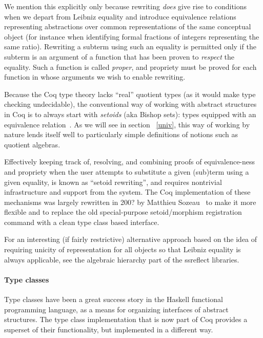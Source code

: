 \documentclass[a4paper,10pt,runningheads]{llncs}
\begin{document}
We mention this explicitly only because rewriting \emph{does} give rise to conditions when we depart from Leibniz equality and introduce equivalence relations representing abstractions over common representations of the same conceptual object (for instance when identifying formal fractions of integers representing the same ratio). Rewriting a subterm using such an equality is permitted only if the subterm is an argument of a function that has been proven to \emph{respect} the equality. Such a function is called \emph{proper}, and propriety must be proved for each function in whose arguments we wish to enable rewriting.

Because the Coq type theory lacks ``real'' quotient types (as it would make type checking undecidable), the conventional way of working with abstract structures in Coq is to always start with \emph{setoids} (aka Bishop sets): types equipped with an equivalence relation~\cite{Bishop67,Hofmann,Capretta}. As we will see in section ~\ref{univ}, this way of working by nature lends itself well to particularly simple definitions of notions such as quotient algebras.

Effectively keeping track of, resolving, and combining proofs of equivalence-ness and propriety when the user attempts to substitute a given (sub)term using a given equality, is known as ``setoid rewriting'', and requires nontrivial infrastructure and support from the system. The Coq implementation of these mechanisms was largely rewritten in 200? by Matthieu Sozeau~\cite{Setoid-rewrite} to make it more flexible and to replace the old special-purpose setoid/morphism registration command with a clean type class based interface.

For an interesting (if fairly restrictive) alternative approach based on the idea of requiring unicity of representation for all objects so that Leibniz equality is always applicable, see the algebraic hierarchy part of the ssreflect\cite{ssreflect} libraries.

\paragraph{Type classes}

Type classes have been a great success story in the Haskell functional programming language, as a means for organizing interfaces of abstract structures. The type class implementation that is now part of Coq provides a superset of their functionality, but implemented in a different way.
\end{document}
